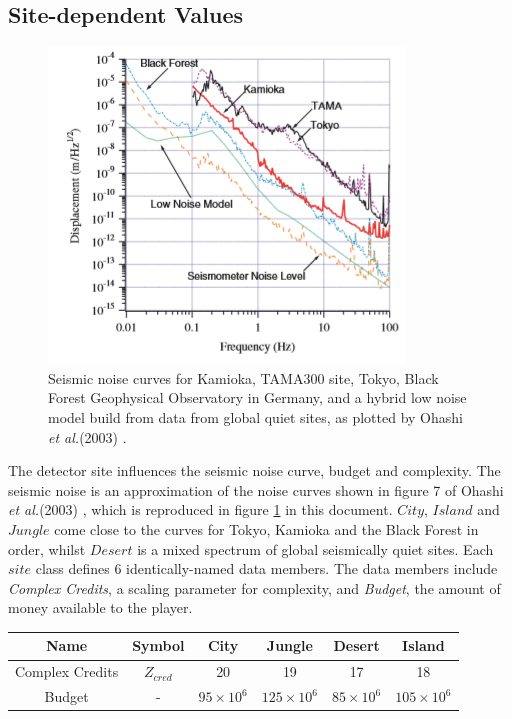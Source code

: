 \documentclass{article}
\begin{document}
\begin{appendix}
\subsection{Site-dependent Values}
\label{sec:sites}
\begin{figure}
        \centering
        \includegraphics{noisecurves.PNG}        \caption{Seismic noise curves for Kamioka, TAMA300 site, Tokyo, Black Forest Geophysical Observatory in Germany, and a hybrid low noise model build from data from global quiet sites, as plotted by Ohashi \textit{et al.}(2003) \cite{CLIO}.}
        \label{fig:ohashi}
    \end{figure}
    The detector site influences the seismic noise curve, budget and complexity. The seismic noise is an approximation of the noise curves shown in figure 7 of Ohashi \textit{et al.}(2003) \cite{CLIO}, which is reproduced in figure \ref{fig:ohashi} in this document. $City$, $Island$ and $Jungle$ come close to the curves for Tokyo, Kamioka and the Black Forest in order, whilst $Desert$ is a mixed spectrum of global seismically quiet sites. Each $site$ class defines 6 identically-named data members. The data members include \textit{Complex Credits}, a scaling parameter for complexity, and \textit{Budget}, the amount of money available to the player.
    \begin{center}
    \begin{tabular}{ |c|c|c|c|c|c| } 
     \hline
     \textbf{Name} & \textbf{Symbol} & \textbf{City}  & \textbf{Jungle}  & \textbf{Desert}  & \textbf{Island} \\ 
     \hline
     Complex Credits & $Z_{cred}$ & 20 & 19 & 17 & 18\\ 
     \hline
     Budget & - & $95 \times 10^6$ & $125 \times 10^6$ & $85 \times 10^6$ & $105 \times 10^6$\\ 

\end{tabular}
\end{center}
\end{appendix}
\end{document}
